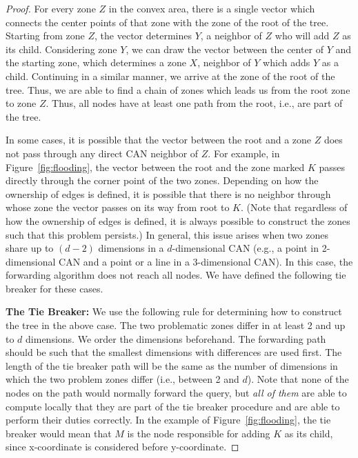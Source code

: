 \documentclass[fleqn,12pt,twoside]{article}
\begin{document}
\begin{proof}
  For every zone $Z$ in the convex area, there is a single vector
  which connects the center points of that zone with the zone of the
  root of the tree. Starting from zone $Z$, the vector determines $Y$,
  a neighbor of $Z$ who will add $Z$ as its child.  Considering zone
  $Y$, we can draw the vector between the center of $Y$ and the
  starting zone, which determines a zone $X$, neighbor of $Y$ which
  adds $Y$ as a child. Continuing in a similar manner, we arrive at
  the zone of the root of the tree. Thus, we are able to find a chain
  of zones which leads us from the root zone to zone $Z$. Thus,
  all nodes have at least one path from the root, i.e., are part of
  the tree.

  In some cases, it is possible that the vector between the
  root and a zone $Z$ does not pass through any direct CAN neighbor of
  $Z$. For example, in Figure~\ref{fig:flooding}, the vector between
  the root and the zone marked $K$ passes directly through the corner
  point of the two zones. Depending on how the ownership of edges is
  defined, it is possible that there is no neighbor through whose zone
  the vector passes on its way from root to $K$.  (Note that
  regardless of how the ownership of edges is defined, it is always
  possible to construct the zones such that this problem persists.) In
  general, this issue arises when two zones share up to $(d-2)$
  dimensions in a $d$-dimensional CAN (e.g., a point in 2-dimensional
  CAN and a point or a line in a 3-dimensional CAN). In this case, the
  forwarding algorithm does not reach all nodes. We have defined the
  following tie breaker for these cases.

  \textbf{The Tie Breaker:} We use the following rule for determining
  how to construct the tree in the above case. The two problematic
  zones differ in at least 2 and up to $d$ dimensions. We order the
  dimensions beforehand.  The forwarding path should be such that the
  smallest dimensions with differences are used first. The length of
  the tie breaker path will be the same as the number of dimensions in
  which the two problem zones differ (i.e., between 2 and $d$). Note
  that none of the nodes on the path would normally forward the query,
  but \emph{all of them} are able to compute locally that they are
  part of the tie breaker procedure and are able to perform their
  duties correctly. In the example of Figure~\ref{fig:flooding}, the
  tie breaker would mean that $M$ is the node responsible for adding
  $K$ as its child, since x-coordinate is considered before
  y-coordinate.
\end{proof}
\end{document}
